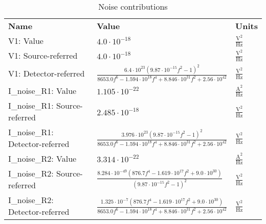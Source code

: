 \begin{table}[H]
\centering
\begin{tabular}[c]{lll}
\textbf{Name} & \textbf{Value} & \textbf{Units} \\ 
\rowcolor{myyellow}
\small{V1: Value} &$4.0 \cdot 10^{-18}$ &$\mathrm{\frac{V^2}{Hz}}$ \\ 
\small{V1: Source-referred} &$4.0 \cdot 10^{-18}$ &$\mathrm{\frac{V^2}{Hz}}$ \\ 
\rowcolor{myyellow}
\small{V1: Detector-referred} &$\frac{6.4 \cdot 10^{23} \left(9.87 \cdot 10^{-15} f^{2} - 1\right)^{2}}{8653.0 f^{6} - 1.594 \cdot 10^{18} f^{4} + 8.846 \cdot 10^{31} f^{2} + 2.56 \cdot 10^{42}}$ &$\mathrm{\frac{V^2}{Hz}}$ \\ 
\small{I\_noise\_R1: Value} &$1.105 \cdot 10^{-22}$ &$\mathrm{\frac{A^2}{Hz}}$ \\ 
\rowcolor{myyellow}
\small{I\_noise\_R1: Source-referred} &$2.485 \cdot 10^{-18}$ &$\mathrm{\frac{V^2}{Hz}}$ \\ 
\small{I\_noise\_R1: Detector-referred} &$\frac{3.976 \cdot 10^{23} \left(9.87 \cdot 10^{-15} f^{2} - 1\right)^{2}}{8653.0 f^{6} - 1.594 \cdot 10^{18} f^{4} + 8.846 \cdot 10^{31} f^{2} + 2.56 \cdot 10^{42}}$ &$\mathrm{\frac{V^2}{Hz}}$ \\ 
\rowcolor{myyellow}
\small{I\_noise\_R2: Value} &$3.314 \cdot 10^{-22}$ &$\mathrm{\frac{A^2}{Hz}}$ \\ 
\small{I\_noise\_R2: Source-referred} &$\frac{8.284 \cdot 10^{-49} \left(876.7 f^{4} - 1.619 \cdot 10^{17} f^{2} + 9.0 \cdot 10^{30}\right)}{\left(9.87 \cdot 10^{-15} f^{2} - 1\right)^{2}}$ &$\mathrm{\frac{V^2}{Hz}}$ \\ 
\rowcolor{myyellow}
\small{I\_noise\_R2: Detector-referred} &$\frac{1.325 \cdot 10^{-7} \left(876.7 f^{4} - 1.619 \cdot 10^{17} f^{2} + 9.0 \cdot 10^{30}\right)}{8653.0 f^{6} - 1.594 \cdot 10^{18} f^{4} + 8.846 \cdot 10^{31} f^{2} + 2.56 \cdot 10^{42}}$ &$\mathrm{\frac{V^2}{Hz}}$ \\ 
\end{tabular}
\caption{Noise contributions}
\label{tab-noise}
\end{table}

